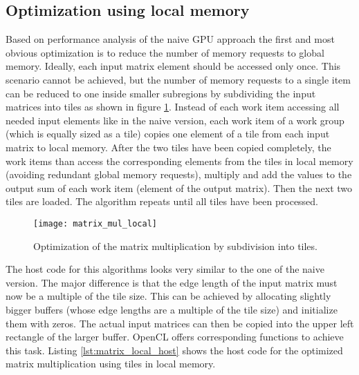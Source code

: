 \subsection{Optimization using local memory}
\label{sec:matrix_mul_local}
Based on performance analysis of the naive GPU approach the first and most obvious optimization is to reduce the number of memory requests to global memory. Ideally, each input matrix element should be accessed only once. This scenario cannot be achieved, but the number of memory requests to a single item can be reduced to one inside smaller subregions by subdividing the input matrices into tiles as shown in figure \ref{fig:matrix_mul_local}. Instead of each work item accessing all needed input elements like in the naive version, each work item of a work group (which is equally sized as a tile) copies one element of a tile from each input matrix to local memory. After the two tiles have been copied completely, the work items than access the corresponding elements from the tiles in local memory (avoiding redundant global memory requests), multiply and add the values to the output sum of each work item (element of the output matrix). Then the next two tiles are loaded. The algorithm repeats until all tiles have been processed.

\begin{figure}
\centering
\texttt{[image: matrix\_mul\_local]}
\caption{Optimization of the matrix multiplication by subdivision into tiles.}
\label{fig:matrix_mul_local}
\end{figure}

The host code for this algorithms looks very similar to the one of the naive version. The major difference is that the edge length of the input matrix must now be a multiple of the tile size. This can be achieved by allocating slightly bigger buffers (whose edge lengths are a multiple of the tile size) and initialize them with zeros. The actual input matrices can then be copied into the upper left rectangle of the larger buffer. OpenCL offers corresponding functions to achieve this task. Listing \ref{lst:matrix_local_host} shows the host code for the optimized matrix multiplication using tiles in local memory.



